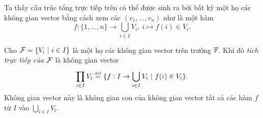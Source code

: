 \begin{comment*}
    Ta thấy cấu trúc tổng trực tiếp trên có thể được sinh ra bởi bất kỳ một họ các không gian vector bằng cách xem các $(v_1,\ldots, v_n)$ như là một hàm \[f:\{1,\ldots,n\} \to \bigcup_{i\in I } V_i,~i \mapsto f(i) \in V_i.\]
\end{comment*}
\begin{defn}
    Cho $\mathcal{F} = \{V_i~|~i \in I\}$ là một họ các không gian vector trên trường $\mathbb{F}$. Khi đó \textit{tích trực tiếp của $\mathcal{F}$} là không gian vector
    \[\prod_{i \in I}{V_i}\overset{\underset{\mathrm{def}}{}}{=} \{f: I \to \bigcup_{i\in I } {V_i}~|~f(i) \in V_i\}.\]
    Không gian vector này là không gian con của không gian vector tất cả các hàm $f$ từ $I$ vào $\bigcup_{i\in I } V_i$.
\end{defn}
